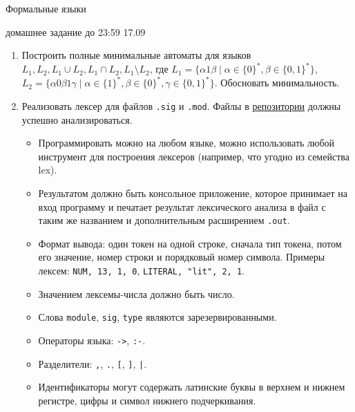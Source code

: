 \documentclass[12pt]{article}
\begin{document}
\begin{center} {\LARGE Формальные языки} \end{center}

\begin{center} \Large домашнее задание до 23:59 17.09 \end{center}
\bigskip

\begin{enumerate}
  \item
  {
    Построить полные минимальные автоматы для языков $L_1, L_2, L_1 \cup L_2, L_1 \cap L_2, L_1 \setminus L_2$, где $L_1 = \{ \alpha 1 \beta \mid \alpha \in \{0\}^*, \beta \in \{0, 1\}^* \}$, $L_2 = \{ \alpha 0 \beta 1 \gamma \mid \alpha \in \{1\}^*, \beta \in \{0\}^*, \gamma \in \{0, 1\}^* \}$. Обосновать минимальность.
  }
  \item
  {
    Реализовать лексер для файлов \verb!.sig! и \verb!.mod!. Файлы в \href{https://github.com/kajigor/fl_2020_hse_win/tree/f8315a3bdfb721945ab26648b71e7cadad097833/prolog}{репозитории} должны успешно анализироваться.
    \begin{itemize}
      \item Программировать можно на любом языке, можно использовать любой инструмент для построения лексеров (например, что угодно из семейства lex).
      \item Результатом должно быть консольное приложение, которое принимает на вход программу и печатает результат лексического анализа в файл с таким же названием и дополнительным расширением \verb!.out!.
      \item Формат вывода: один токен на одной строке, сначала тип токена, потом его значение, номер строки и порядковый номер символа. Примеры лексем: \verb!NUM, 13, 1, 0!, \verb!LITERAL, "lit", 2, 1!.
      \item Значением лексемы-числа должно быть число.
      \item Слова \verb!module!, \verb!sig!, \verb!type! являются зарезервированными.
      \item Операторы языка: \verb!->!, \verb!:-!.
      \item Разделители: \verb!,!, \verb!.!, \verb![!, \verb!]!, \verb!|!.
      \item Идентификаторы могут содержать латинские буквы в верхнем и нижнем регистре, цифры и символ нижнего подчеркивания.
    \end{itemize}
  }
\end{enumerate}
\end{document}
